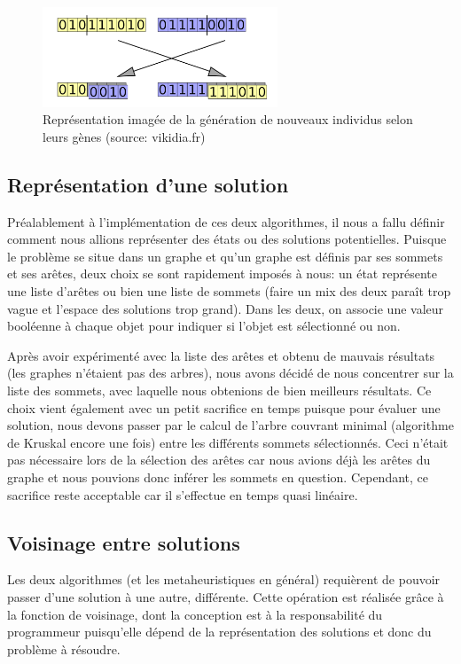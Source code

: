 \documentclass{article}
\begin{document}
\begin{figure}[!h]
	\centerline{ \includegraphics[width=7cm]{images/algogenetique.png}}
	\caption{Représentation imagée de la génération de nouveaux individus selon leurs gènes (source: vikidia.fr) }
\end{figure}

\subsection{Représentation d'une solution}
Préalablement à l'implémentation de ces deux algorithmes, il nous a fallu définir comment nous allions représenter des états ou des solutions potentielles. Puisque le problème se situe dans un graphe et qu'un graphe est définis par ses sommets et ses arêtes, deux choix se sont rapidement imposés à nous: un état représente une liste d'arêtes ou bien une liste de sommets (faire un mix des deux paraît trop vague et l'espace des solutions trop grand). Dans les deux, on associe une valeur booléenne à chaque objet pour indiquer si l'objet est sélectionné ou non. \\ \par

Après avoir expérimenté avec la liste des arêtes et obtenu de mauvais résultats (les graphes n'étaient pas des arbres), nous avons décidé de nous concentrer sur la liste des sommets, avec laquelle nous obtenions de bien meilleurs résultats. Ce choix vient également avec un petit sacrifice en temps puisque pour évaluer une solution, nous devons passer par le calcul de l'arbre couvrant minimal (algorithme de Kruskal encore une fois) entre les différents sommets sélectionnés. Ceci n'était pas nécessaire lors de la sélection des arêtes car nous avions déjà les arêtes du graphe et nous pouvions donc inférer les sommets en question. Cependant, ce sacrifice reste acceptable car il s'effectue en temps quasi linéaire.

\subsection{Voisinage entre solutions}
Les deux algorithmes (et les metaheuristiques en général) requièrent de pouvoir passer d'une solution à une autre, différente. Cette opération est réalisée grâce à la fonction de voisinage, dont la conception est à la responsabilité du programmeur puisqu'elle dépend de la représentation des solutions et donc du problème à résoudre. \\ \par
\end{document}
